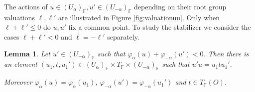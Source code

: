 \documentclass[12pt]{amsart}
\newcommand{\F}{\mathbb{F} }
\numberwithin{equation}{section}
\newtheorem{lemma}[theorem]{Lemma}
\theoremstyle{remark} %
\begin{document}
		The actions of $ u\in (U_\alpha)_\F, u' \in (U_{-\alpha})_\F$ depending on their root group valuations $\ell, \ell'$ are illustrated in Figure \ref{fig:valuationuu}. Only when $\ell + \ell' \leq 0$ do $u,u'$ fix a common point. To study the stabilizer we consider the cases $\ell + \ell' < 0$ and $\ell = -\ell'$ separately.
		\begin{lemma}\label{lem:BTuu_usu}
			Let 
			$u'\in (U_{-\alpha})_\F$ such that $\varphi_\alpha(u) + \varphi_{-\alpha}(u') < 0$. Then there is an element $(u_1, t , u_1') \in (U_{\alpha})_\F \times T_\F %
			\times (U_{-\alpha})_\F $ such that $u'u = u_1 t u_1'$. 
			
			Moreover $\varphi_\alpha(u) = \varphi_{\alpha}(u_1)$, $\varphi_{-\alpha}(u') = \varphi_{-\alpha}(u_1')$ and $t \in T_\F(O)$.
		\end{lemma}
\end{document}
